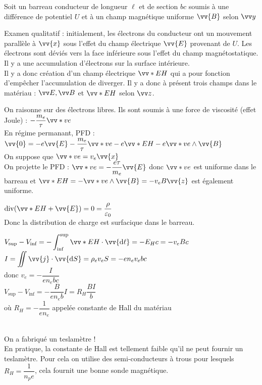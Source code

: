 ﻿\documentclass[a4paper]{article}
\begin{document}
\pagestyle{fancy}
\fancyhf{}
\setlength{\headheight}{15pt}

\begin{center}
	\large{}
\end{center}


Soit un barreau conducteur de longueur $\ell$ et de section $bc$ soumis à une différence de potentiel $U$ et à un champ magnétique uniforme $\vv{B}$ selon $\vv y$\par
Examen qualitatif : initialement, les électrons du conducteur ont un mouvement parallèle à $\vv{x}$ sous l'effet du champ électrique $\vv{E}$ provenant de $U$. Les électrons sont déviés vers la face inférieure sous l'effet du champ magnétostatique. Il y a une accumulation d'électrons sur la surface intérieure.\\
Il y a donc création d'un champ électrique $\vv*EH$ qui a pour fonction d'empêcher l'accumulation de diverger. Il y a donc à présent trois champs dans le matériau : $\vv E,\vv B$ et $\vv*EH$ selon $\vv z$.

On raisonne sur des électrons libres. Ils sont soumis à une force de viscosité (effet Joule) : $-\dfrac{m_e}{\tau}\vv*{v}{e}$\\
En régime permanant, PFD : $\vv{0}=-e\vv{E}-\dfrac{m_e}{\tau}\vv*{v}{e}-e\vv*{E}{H}-e\vv*{v}{e}\wedge\vv{B}$\\
On suppose que $\vv*{v}{e}=v_e\vv{x}$\\
On projette le PFD : $\vv*{v}{e}=-\dfrac{e\tau}{m_e}\vv{E}$ donc $\vv*{v}{e}$ est uniforme dans le barreau et $\vv*{E}{H}=-\vv*{v}{e}\wedge\vv{B}=-v_eB\vv{z}$ est également uniforme.\par
$\mathrm{div}(\vv*{E}{H}+\vv{E})=0=\dfrac{\rho}{\varepsilon_0}$\\
Donc la distribution de charge est surfacique dans le barreau.
\\
\begin{minipage}{0.5\linewidth}
  $V_{\text{sup}}-V_{\text{inf}}=-\displaystyle\int_{\text{inf}}^{\text{sup}}\vv*EH\cdot\vv{\mathrm{d}\ell}=-E_Hc=-v_eBc$\\
  $I=\displaystyle\iint\vv{j}\cdot\vv{\mathrm{d}S}=\rho_ev_eS=-en_ev_ebc$\\
  donc $v_e=-\dfrac{I}{en_ebc}$\\
  $V_{\text{sup}}-V_{\text{inf}}=-\dfrac{B}{en_eb}I=R_H\dfrac{BI}{b}$\\
  où $R_H=-\dfrac{1}{en_e}$ appelée constante de Hall du matériau
\end{minipage}
\\
On a fabriqué un teslamètre !\\
En pratique, la constante de Hall est tellement faible qu'il ne peut fournir un teslamètre. Pour cela on utilise des semi-conducteurs à trous pour lesquels $R_H=\dfrac{1}{n_pe}$, cela fournit une bonne sonde magnétique.
\end{document}
